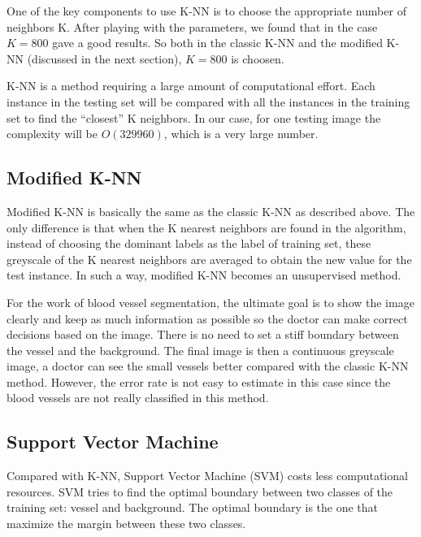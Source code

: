 \documentclass[12pt, notitlepage]{article}
\begin{document}
One of the key components to use K-NN is to choose the appropriate number of neighbors K.  After playing with the parameters, we found that in the case $K=800$ gave a good results.  So both in the classic K-NN and the modified K-NN (discussed in the next section),  $K=800$ is choosen.

K-NN is a method requiring a large amount of computational effort. Each instance in the testing set will be compared with all the instances in the training set to find the ``closest'' K neighbors. In our case, for one testing image the complexity will be $O(329960)$, which is a very large number. 
 
\subsection{Modified K-NN}\label{sec:modi_knn}

Modified K-NN is basically the same as the classic K-NN as described above.  The only difference is that when the K nearest neighbors are found in the algorithm, instead of choosing the dominant labels as the label of training set, these greyscale of the K nearest neighbors are averaged to obtain the new value for the test instance. In such a way, modified K-NN becomes an unsupervised method.  

For the work of blood vessel segmentation, the ultimate goal is to show the image clearly and keep as much information as possible so the doctor can make correct decisions based on the image. There is no need to set a stiff boundary between the vessel and the background.  The final image is then a continuous greyscale image, a doctor can see the small vessels better compared with the classic K-NN method.  However, the error rate is not easy to estimate in this case since the blood vessels are not really classified in this method. 

\subsection{Support Vector Machine}

Compared with K-NN, Support Vector Machine (SVM) costs less computational resources.  SVM tries to find the optimal boundary between two classes of the training set: vessel and background. The optimal boundary is the one that maximize the margin between these two classes.  
\end{document}
